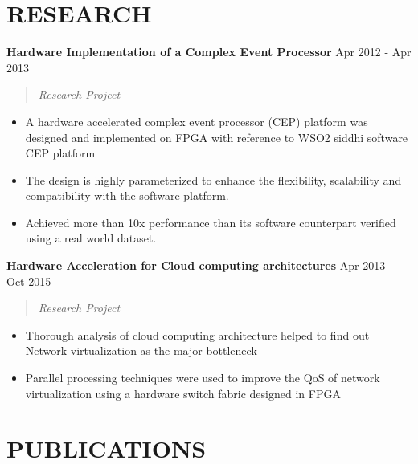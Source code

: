 \documentclass[mm]{res} %
\begin{document}
\begin{resume}
\vspace {2 mm}
\section{RESEARCH} 

\textbf{Hardware Implementation of a Complex Event Processor} \hfill Apr 2012 - Apr 2013
\begin{quote}
	\emph{Research Project}
\end{quote}

\begin{itemize} \itemsep -1pt %
	\item A hardware accelerated complex event processor (CEP) platform was designed and implemented on FPGA with reference to WSO2 siddhi software CEP platform
	\item The design is highly parameterized to enhance the flexibility, scalability and compatibility with the software platform.
	\item Achieved more than 10x performance than its software counterpart verified using a real world dataset.
\end{itemize}

\textbf{Hardware Acceleration for Cloud computing architectures} \hfill Apr 2013 - Oct 2015
\begin{quote}
\emph{Research Project}
\end{quote}

\begin{itemize} \itemsep -1pt %
\item Thorough analysis of cloud computing architecture helped to find out Network virtualization as the major bottleneck
\item Parallel processing techniques were used to improve the QoS of network virtualization using a hardware switch fabric designed in FPGA
\end{itemize}

\vspace {2 mm}
\section{PUBLICATIONS} 


\end{resume}
\end{document}
